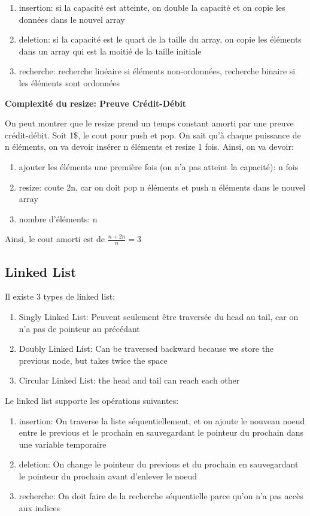 \documentclass{article}
\begin{document}
\begin{enumerate}
    \item insertion: si la capacité est atteinte, on double la capacité
	et on copie les données dans le nouvel array
    \item deletion: si la capacité est le quart de la taille du array,
	on copie les éléments dans un array qui est la moitié de la
	taille initiale
    \item recherche: recherche linéaire si éléments non-ordonnées,
	recherche binaire si les éléments sont ordonnées
\end{enumerate}

\textbf{Complexité du resize: Preuve Crédit-Débit}

On peut montrer que le resize prend un temps constant amorti par une
preuve crédit-débit. Soit 1\$, le cout pour push et pop.
On sait qu'à chaque puissance de n éléments, on va devoir insérer n éléments
et resize 1 fois. Ainsi, on va devoir:
\begin{enumerate}
    \item ajouter les éléments une première fois (on n'a pas atteint la
	capacité): n fois
    \item resize: coute 2n, car on doit pop n éléments et push n éléments
	dans le nouvel array
    \item nombre d'éléments: n
\end{enumerate}

Ainsi, le cout amorti est de $ \frac{n+2n}{n} = 3 $

\subsection{Linked List}

Il existe 3 types de linked list:
\begin{enumerate}
    \item Singly Linked List: Peuvent seulement être traversée du head
	au tail, car on n'a pas de pointeur au précédant
    \item Doubly Linked List: Can be traversed backward because we
	store the previous node, but takes twice the space
    \item Circular Linked List: the head and tail can reach each other
\end{enumerate}

Le linked list supporte les opérations suivantes:
\begin{enumerate}
    \item insertion: On traverse la liste séquentiellement, et on ajoute
	le nouveau noeud entre le previous et le prochain en sauvegardant
	le pointeur du prochain dans une variable temporaire
    \item deletion: On change le pointeur du previous et du prochain en
	sauvegardant le pointeur du prochain avant d'enlever le noeud
    \item recherche: On doit faire de la recherche séquentielle parce
	qu'on n'a pas accès aux indices
\end{enumerate}
\end{document}
